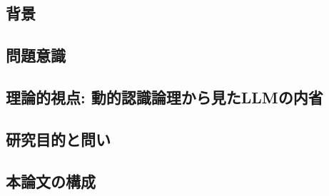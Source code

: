 
\subsection{背景}\label{subsec:background}


\subsection{問題意識}\label{subsec:problem}


\subsection{理論的視点: 動的認識論理から見たLLMの内省}\label{subsec:del-motivation}


\subsection{研究目的と問い}\label{subsec:rq}


\subsection{本論文の構成}\label{subsec:structure}

